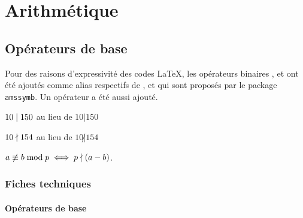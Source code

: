 \documentclass[12pt,a4paper]{article}
\begin{document}
\section{Arithmétique}

\subsection{Opérateurs de base}

Pour des raisons d'expressivité des codes \LaTeX{}, les opérateurs binaires ,  et  ont été ajoutés comme alias respectifs de ,  et  qui sont proposés par le package \verb+amssymb+. Un opérateur  a été aussi ajouté.

\begin{latexex}
$10 \mid 150$ au lieu de
$10 | 150$

$10 \nmid 154$ au lieu de
$10 \not| 154$

$a \nequiv b \modulo p
 \iff
 p \ndivides (a - b)$.
\end{latexex}




\subsubsection{Fiches techniques}

\paragraph{Opérateurs de base}



\extraspace


\extraspace

\end{document}
